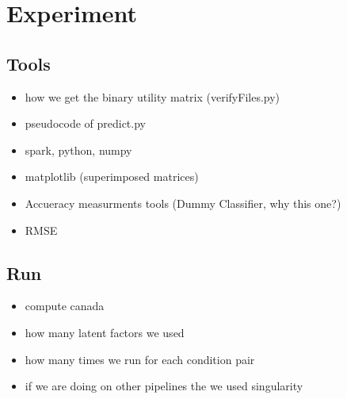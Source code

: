 \chapter{Experiment}
\section{Tools}
\begin{tcolorbox}
\begin{itemize}
\item how we get the binary utility matrix (verifyFiles.py)
\item pseudocode of predict.py
\item spark, python, numpy
\item matplotlib (superimposed matrices)
\item Accueracy measurments tools (Dummy Classifier, why this one?)
\item RMSE
\end{itemize}
\end{tcolorbox}

\section{Run}
\begin{tcolorbox}
\begin{itemize}
\item compute canada
\item how many latent factors we used
\item how many times we run for each condition pair
\item if we are doing on other pipelines the we used singularity
\end{itemize}
\end{tcolorbox}
